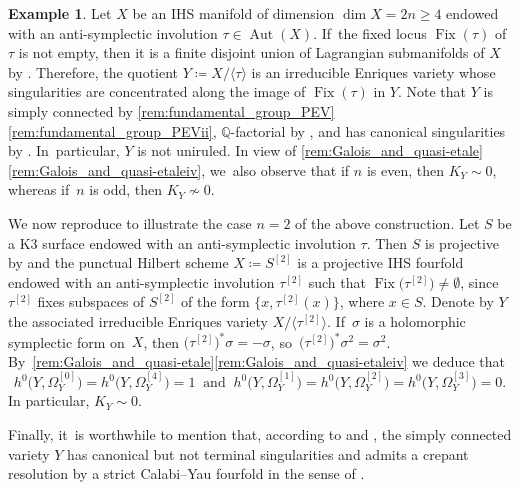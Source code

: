 \documentclass[JEP,XML,SOM,Unicode,published]{cedram}
\theoremstyle{plain}
\theoremstyle{definition}
\newtheorem{exa}[thm]{Example}
\newcommand{\Q}{\mathbb{Q}}
\DeclareMathOperator{\Aut}{Aut}
\DeclareMathOperator{\Fix}{Fix}
\begin{document}
\begin{exa}
\label{example:IEV_via_anti-symplectic_involution}
Let $X$ be an IHS manifold of dimension $\dim X = 2n \geq 4$ endowed with an anti-symplectic involution $\tau \in \Aut(X)$. If~the fixed locus $\Fix(\tau)$ of $\tau$ is not empty, then it is a finite disjoint union of Lagrangian submanifolds of $X$ by \cite[Lem.\,1]{Beauville11}.
Therefore, the quotient $Y \coloneqq X/ \langle \tau \rangle$ is an irreducible Enriques variety whose singularities are concentrated along the image of $\Fix(\tau)$ in $Y$. Note that $Y$ is simply connected by \autoref{rem:fundamental_group_PEV}\eqref{rem:fundamental_group_PEVii}, $\Q$\nobreakdash-factorial by \cite[Prop.\,5.15]{KM98}, and has canonical singularities by \cite[Cor.\,2.31(2) \& Prop.\,5.20(2)]{KM98}. In~particular, $Y$ is not uniruled.
In view of \autoref{rem:Galois_and_quasi-etale}\eqref{rem:Galois_and_quasi-etaleiv}, we~also observe that if $n$ is even, then $K_Y \sim 0$, whereas if~$n$ is odd, then $K_Y \not \sim 0$.

We now reproduce \cite[Ex.\,14.9]{GGK19} to illustrate the case $n=2$ of the above construction. Let $S$ be a K3 surface endowed with an anti-symplectic involution $\tau$. Then $S$ is projective by \cite[Prop.\,6(i)]{Beauville83b} and the punctual Hilbert scheme $X \coloneqq S^{[2]}$ is a projective IHS fourfold endowed with an anti-symplectic involution $\tau^{[2]}$ such that $\Fix\bigl(\tau^{[2]} \bigr) \neq \emptyset$, since $\tau^{[2]}$ fixes subspaces of $S^{[2]}$ of the form $ \big \{ x, \tau^{[2]}(x) \big \}$, where $x \in S$. Denote by $Y$ the associated irreducible Enriques variety $X / \langle \tau^{[2]} \rangle$. If~$\sigma$ is a holomorphic symplectic form on~$X$, then $\bigl(\tau^{[2]} \bigr)^* \sigma = -\sigma$, so~$\bigl(\tau^{[2]} \bigr)^* \sigma^2 = \sigma^2$. By~\autoref{rem:Galois_and_quasi-etale}\eqref{rem:Galois_and_quasi-etaleiv} we deduce that
\[
h^0 \bigl(Y,\Omega_Y^{[0]} \bigr) = h^0 \bigl(Y,\Omega_Y^{[4]} \bigr) = 1 \ \text{ and } \ h^0 \bigl(Y,\Omega_Y^{[1]} \bigr) = h^0 \bigl(Y,\Omega_Y^{[2]} \bigr) = h^0 \bigl(Y,\Omega_Y^{[3]} \bigr) = 0.
\]
In particular, $K_Y \sim 0$.

Finally, it~is worthwhile to mention that, according to \cite[Th.\,3.6]{CGM19} and \cite[Th.\,1.1]{Tak03}, the simply connected variety $Y$ has canonical but not terminal singularities and admits a crepant resolution by a strict Calabi--Yau fourfold in the sense of \cite[Prop.\,2]{Beauville83a}.
\end{exa}
\end{document}
